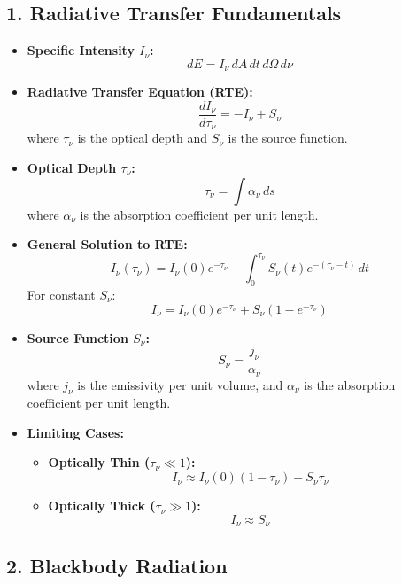 \documentclass{article}
\begin{document}
\subsection*{1. Radiative Transfer Fundamentals}

\begin{itemize}
    \item \textbf{Specific Intensity \( I_\nu \):}
          \[
              dE = I_\nu \, dA \, dt \, d\Omega \, d\nu
          \]
    \item \textbf{Radiative Transfer Equation (RTE):}
          \[
              \frac{dI_\nu}{d\tau_\nu} = -I_\nu + S_\nu
          \]
          where \( \tau_\nu \) is the optical depth and \( S_\nu \) is the source function.
    \item \textbf{Optical Depth \( \tau_\nu \):}
          \[
              \tau_\nu = \int \alpha_\nu \, ds
          \]
          where \( \alpha_\nu \) is the absorption coefficient per unit length.
    \item \textbf{General Solution to RTE:}
          \[
              I_\nu(\tau_\nu) = I_\nu(0) e^{-\tau_\nu} + \int_0^{\tau_\nu} S_\nu(t) e^{-(\tau_\nu - t)} \, dt
          \]
          For constant \( S_\nu \):
          \[
              I_\nu = I_\nu(0) e^{-\tau_\nu} + S_\nu (1 - e^{-\tau_\nu})
          \]
    \item \textbf{Source Function \( S_\nu \):}
          \[
              S_\nu = \frac{j_\nu}{\alpha_\nu}
          \]
          where \( j_\nu \) is the emissivity per unit volume, and \( \alpha_\nu \) is the absorption coefficient per unit length.
    \item \textbf{Limiting Cases:}
          \begin{itemize}
              \item \textbf{Optically Thin (\( \tau_\nu \ll 1 \)):}
                    \[
                        I_\nu \approx I_\nu(0)(1 - \tau_\nu) + S_\nu \tau_\nu
                    \]
              \item \textbf{Optically Thick (\( \tau_\nu \gg 1 \)):}
                    \[
                        I_\nu \approx S_\nu
                    \]
          \end{itemize}
\end{itemize}

\subsection*{2. Blackbody Radiation}
\end{document}
